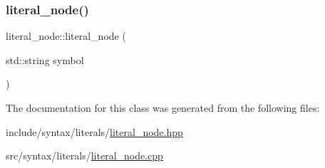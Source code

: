 \subsubsection{\texorpdfstring{literal\+\_\+node()}{literal\_node()}}
{\footnotesize\ttfamily literal\+\_\+node\+::literal\+\_\+node (\begin{DoxyParamCaption}\item[{std\+::string}]{symbol }\end{DoxyParamCaption})}



The documentation for this class was generated from the following files\+:\begin{DoxyCompactItemize}
\item 
include/syntax/literals/\hyperlink{literal__node_8hpp}{literal\+\_\+node.\+hpp}\item 
src/syntax/literals/\hyperlink{literal__node_8cpp}{literal\+\_\+node.\+cpp}\end{DoxyCompactItemize}
